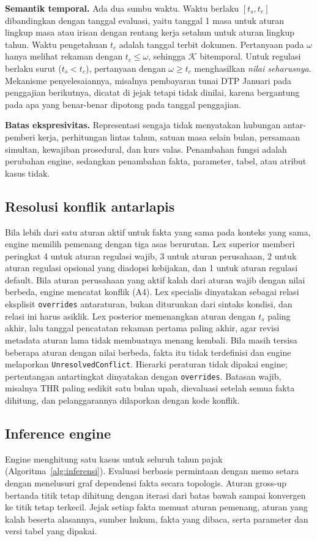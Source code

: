 \documentclass[conference]{IEEEtran}
\makeatletter
\DeclareRobustCommand{\en}[1]{{\usefont{\f@encoding}{\f@family}{\f@series}{it}#1\/}}
\newcommand{\K}{\mathcal{K}}
\makeatother
\begin{document}
\textbf{Semantik temporal.} Ada dua sumbu waktu. Waktu berlaku $[t_s, t_e]$ dibandingkan dengan tanggal evaluasi, yaitu tanggal 1 masa untuk aturan lingkup masa atau irisan dengan rentang kerja setahun untuk aturan lingkup tahun. Waktu pengetahuan $t_c$ adalah tanggal terbit dokumen. Pertanyaan pada $\omega$ hanya melihat rekaman dengan $t_c \leq \omega$, sehingga $\K$ bitemporal. Untuk regulasi berlaku surut ($t_s < t_c$), pertanyaan dengan $\omega \geq t_c$ menghasilkan \emph{nilai seharusnya}. Mekanisme penyelesaiannya, misalnya pembayaran tunai DTP Januari pada penggajian berikutnya, dicatat di jejak tetapi tidak dinilai, karena bergantung pada apa yang benar-benar dipotong pada tanggal penggajian.

\textbf{Batas ekspresivitas.} Representasi sengaja tidak menyatakan hubungan antar-pemberi kerja, perhitungan lintas tahun, satuan masa selain bulan, persamaan simultan, kewajiban prosedural, dan kurs valas. Penambahan fungsi adalah perubahan \en{engine}, sedangkan penambahan fakta, parameter, tabel, atau atribut kasus tidak.

\subsection{Resolusi konflik antarlapis}
Bila lebih dari satu aturan aktif untuk fakta yang sama pada konteks yang sama, \en{engine} memilih pemenang dengan tiga asas berurutan. \en{Lex superior} memberi peringkat 4 untuk aturan regulasi wajib, 3 untuk aturan perusahaan, 2 untuk aturan regulasi opsional yang diadopsi kebijakan, dan 1 untuk aturan regulasi \en{default}. Bila aturan perusahaan yang aktif kalah dari aturan wajib dengan nilai berbeda, \en{engine} mencatat konflik (A4). \en{Lex specialis} dinyatakan sebagai relasi eksplisit \texttt{overrides} antaraturan, bukan diturunkan dari sintaks kondisi, dan relasi ini harus asiklik. \en{Lex posterior} memenangkan aturan dengan $t_s$ paling akhir, lalu tanggal pencatatan rekaman pertama paling akhir, agar revisi metadata aturan lama tidak membuatnya menang kembali. Bila masih tersisa beberapa aturan dengan nilai berbeda, fakta itu tidak terdefinisi dan \en{engine} melaporkan \texttt{UnresolvedConflict}. Hierarki peraturan tidak dipakai \en{engine}; pertentangan antartingkat dinyatakan dengan \texttt{overrides}. Batasan wajib, misalnya THR paling sedikit satu bulan upah, dievaluasi setelah semua fakta dihitung, dan pelanggarannya dilaporkan dengan kode konflik.

\subsection{\en{Inference engine}}
\en{Engine} menghitung satu kasus untuk seluruh tahun pajak (Algoritma~\ref{alg:inferensi}). Evaluasi berbasis permintaan dengan memo setara dengan menelusuri graf dependensi fakta secara topologis. Aturan \en{gross-up} bertanda titik tetap dihitung dengan iterasi dari batas bawah sampai konvergen ke titik tetap terkecil. Jejak setiap fakta memuat aturan pemenang, aturan yang kalah beserta alasannya, sumber hukum, fakta yang dibaca, serta parameter dan versi tabel yang dipakai.
\end{document}

